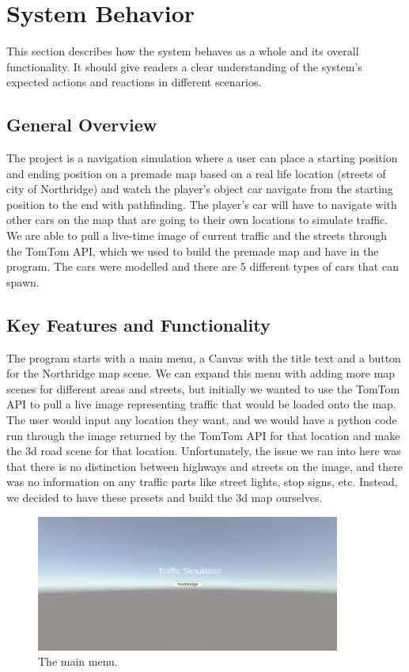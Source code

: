 \section{System Behavior}

This section describes how the system behaves as a whole and its overall functionality. 
It should give readers a clear understanding of the system's expected actions and reactions in different scenarios.

\subsection{General Overview}

The project is a navigation simulation where a user can place a starting position and ending position on a premade map based on a real life location (streets of city of Northridge) and watch the player's object car navigate from the starting position to the end with pathfinding. The player's car will have to navigate with other cars on the map that are going to their own locations to simulate traffic. We are able to pull a live-time image of current traffic and the streets through the TomTom API, which we used to build the premade map and have in the program. The cars were modelled and there are 5 different types of cars that can spawn. 

\subsection{Key Features and Functionality}
The program starts with a main menu, a Canvas with the title text and a button for the Northridge map scene. We can expand this menu with adding more map scenes for different areas and streets, but initially we wanted to use the TomTom API to pull a live image representing traffic that would be loaded onto the map. The user would input any location they want, and we would have a python code run through the image returned by the TomTom API for that location and make the 3d road scene for that location. Unfortunately, the issue we ran into here was that there is no distinction between highways and streets on the image, and there was no information on any traffic parts like street lights, stop signs, etc. Instead, we decided to have these presets and build the 3d map ourselves. 

\begin{figure}[htb]
    \centering
    \includegraphics[width=10cm]{Images/MainMenu.png}
       \caption{The main menu.}
           \label{Fig:Main Menu}
\end{figure}

